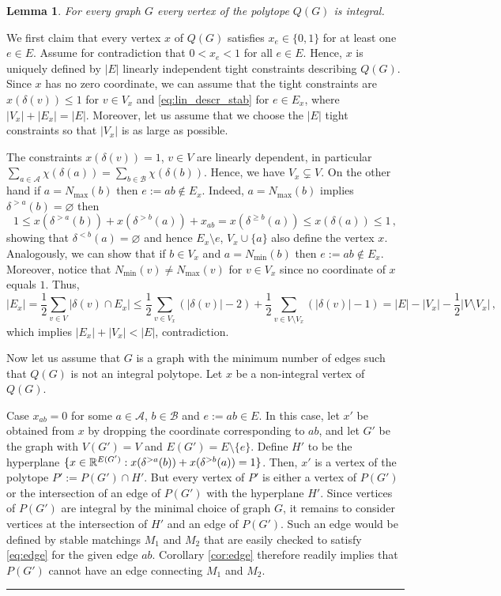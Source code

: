 \documentclass[3p,times]{elsarticle}
\newtheorem{lemma}[fact]{Lemma}
\newenvironment{proof}{{\bf Proof:  }}{\hfill\rule{2mm}{2mm}}
\begin{document}
\begin{lemma}
	For every graph $G$ every vertex of the polytope $Q(G)$ is integral.
\end{lemma}
\begin{proof}
  We first claim that every vertex $x$ of $Q(G)$ satisfies $x_e
  \in \{0,1\}$ for at least one $e \in E$. Assume for contradiction
  that $0 < x_e < 1$ for all $e \in E$. Hence, $x$ is uniquely defined 
  by $|E|$ linearly independent tight constraints
  describing $Q(G)$. Since $x$ has no zero coordinate, we can assume
  that the tight constraints are $x(\delta(v))\le 1$ for $v\in V_x$
  and \eqref{eq:lin_descr_stab} for $e\in E_x$, where
  $|V_x|+|E_x|=|E|$. Moreover, let us assume that we choose the $|E|$
  tight constraints so that $|V_x|$ is as large as possible.

The constraints $x(\delta(v))=1$, $v\in V$ are linearly dependent, in particular $\sum_{a\in\mathcal{A}}\chi(\delta(a))=\sum_{b\in\mathcal{B}}\chi(\delta(b))$. Hence, we have $V_x\subsetneq V$. On the other hand if $a=N_{\max}(b)$ then $e:=ab\not\in E_x$. Indeed, $a=N_{\max}(b)$ implies $\delta^{>a}(b)=\varnothing$ then
$$
	1\le x(\delta^{>a}(b))+ x(\delta^{>b}(a)) + x_{ab}=x(\delta^{\ge b}(a)) \le x(\delta(a)) \le 1\,,
$$
showing that $\delta^{< b}(a)=\varnothing$ and hence $E_x\setminus e$, $V_x\cup \{a\}$ also define the vertex $x$. Analogously, we can show that if $b\in V_x$  and $a=N_{\min}(b)$ then $e:=ab\not\in E_x$. Moreover, notice that $N_{\min}(v)\neq N_{\max}(v)$ for $v\in V_x$ since no coordinate of $x$ equals $1$. Thus, 
\[
	|E_x|=\frac{1}{2}\sum_{v\in V} |\delta(v)\cap E_x|\le \frac{1}{2}\sum_{v\in V_x} (|\delta(v)|-2)+\frac{1}{2}\sum_{v\in V\setminus V_x} (|\delta(v)|-1)= |E|-|V_x|-\frac{1}{2}|V\setminus V_x|\,,
\]
which implies $|E_x|+|V_x|< |E|$, contradiction.

\bigskip

Now let us assume that $G$ is a graph with the minimum number of edges such that $Q(G)$ is not an integral polytope. Let $x$ be a non-integral vertex of $Q(G)$.

Case $x_{ab}=0$ for some $a\in \mathcal{A}$, $b\in\mathcal{B}$ and
$e:=ab\in E$. In this case, let $x'$ be obtained from $x$ by dropping
the coordinate corresponding to $ab$, and let $G'$ be the graph with
$V(G')=V$ and $E(G') = E \setminus \{e\}$. Define $H'$ to be the
hyperplane
$\{x\in \mathbb{R}^{E(G')}: x(\delta^{>a}(b))+ x(\delta^{>b}(a))=1\}$. Then,
$x'$ is a vertex of the polytope $P':=P(G')\cap H'$.  But every vertex
of $P'$ is either a vertex of $P(G')$ or the intersection of an edge
of $P(G')$ with the hyperplane $H'$. Since vertices of $P(G')$ are
integral by the minimal choice of graph $G$, it remains to consider
vertices at the intersection of $H'$ and an edge of $P(G')$. Such an
edge would be defined by stable matchings $M_1$ and $M_2$ that are
easily checked to satisfy \eqref{eq:edge} for the given edge $ab$.
Corollary \ref{cor:edge} therefore readily implies that $P(G')$ cannot
have an edge connecting $M_1$ and $M_2$.


\end{proof}
\end{document}
